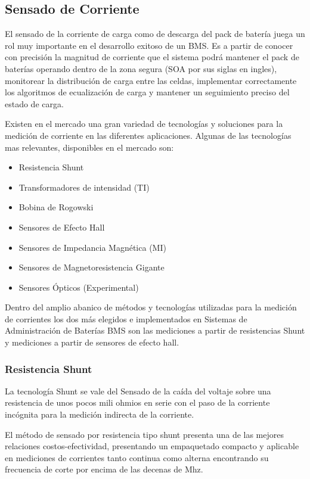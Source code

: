 \documentclass[10pt,a4paper]{article}
\begin{document}
\newpage 

\subsection{Sensado de Corriente}

El sensado de la corriente de carga como de descarga del pack de batería juega
un rol muy importante en el desarrollo exitoso de un \acrshort{BMS}. Es a partir
de conocer con precisión la magnitud de corriente que el sistema podrá mantener
el pack de baterías operando dentro de la zona segura (\acrshort{SOA} por sus
siglas en ingles), monitorear la distribución de carga entre las celdas,
implementar correctamente los algoritmos de ecualización de carga y mantener un
seguimiento preciso del estado de carga.

\noindent Existen en el mercado una gran variedad de tecnologías y 
soluciones para la medición de corriente en las diferentes aplicaciones. 
Algunas de las tecnologías mas relevantes, disponibles en el mercado son:
\begin{itemize}
    \item Resistencia Shunt
    \item Transformadores de intensidad (TI)
    \item Bobina de Rogowski 
    \item Sensores de Efecto Hall
    \item Sensores de Impedancia Magnética (MI)
    \item Sensores de Magnetoresistencia Gigante 
    \item Sensores Ópticos (Experimental)
\end{itemize}

Dentro del amplio abanico de métodos y tecnologías utilizadas para la medición
de corrientes los dos más elegidos e implementados en Sistemas de Administración
de Baterías \acrshort{BMS} son las mediciones a partir de resistencias Shunt y
mediciones a partir de sensores de efecto hall.

\subsubsection{Resistencia Shunt}

La tecnología Shunt se vale del Sensado de la caída del voltaje sobre una
resistencia de unos pocos mili ohmios en serie con el paso de la corriente
incógnita para la medición indirecta de la corriente.

El método de sensado por resistencia tipo shunt presenta una de las mejores
relaciones costos-efectividad, presentando un empaquetado compacto y aplicable
en mediciones de corrientes tanto continua como alterna encontrando su
frecuencia de corte por encima de las decenas de Mhz.
\end{document}
